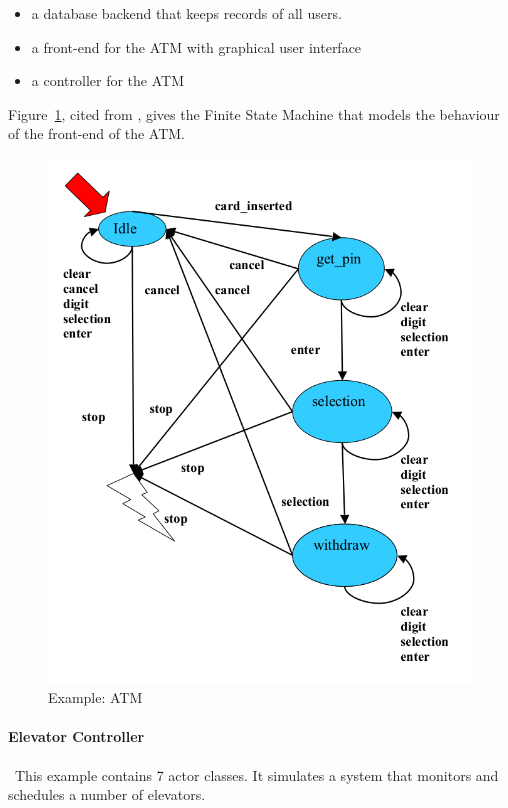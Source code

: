 \begin{itemize}
 \item a database backend that keeps records of all users.
 \item a front-end for the ATM with graphical user interface
 \item a controller for the ATM
\end{itemize}

Figure~\ref{atm}, cited from \citep{atmprivate}, gives the Finite State Machine 
that models the behaviour of the front-end of the ATM.


\begin{figure}[p]
     \begin{center}            
\includegraphics[keepaspectratio=true,height=0.6\paperheight]
{Pictures/ATM_FSM.png}
    \end{center}
     \caption{Example: ATM}
   \label{atm}
\end{figure}


\newpage
\paragraph{Elevator Controller}\ This example contains 7 actor classes.  It 
simulates a system that monitors and schedules a number of elevators.

